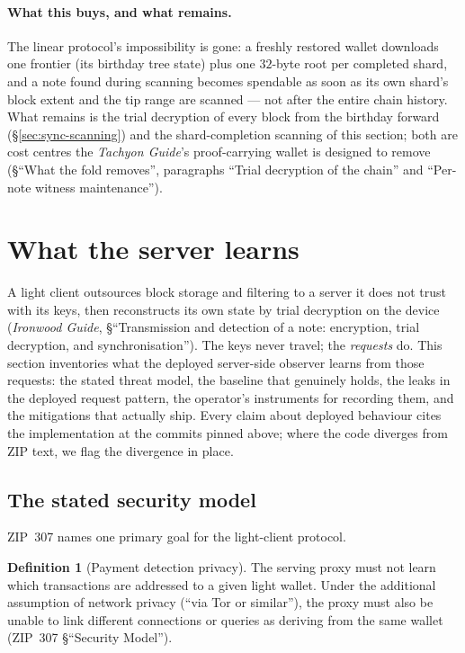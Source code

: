 \documentclass[11pt,a4paper]{article}
\theoremstyle{definition}
\newtheorem{definition}[theorem]{Definition}
\begin{document}
\paragraph{What this buys, and what remains.} The linear protocol's
impossibility is gone: a freshly restored wallet downloads one frontier
(its birthday tree state) plus one $32$-byte root per completed shard,
and a note found during scanning becomes spendable as soon as its own
shard's block extent and the tip range are scanned --- not after the
entire chain history. What remains is the trial decryption of every
block from the birthday forward (\S\ref{sec:sync-scanning}) and the
shard-completion scanning of this section; both are cost centres the
\emph{Tachyon Guide}'s proof-carrying wallet is designed to remove
(\S``What the fold removes'', paragraphs ``Trial decryption of the
chain'' and ``Per-note witness maintenance'').

\section{What the server learns}\label{sec:sync-privacy}

A light client outsources block storage and filtering to a server it does
not trust with its keys, then reconstructs its own state by trial
decryption on the device (\emph{Ironwood Guide}, \S``Transmission and
detection of a note: encryption, trial decryption, and synchronisation'').
The keys never travel; the \emph{requests} do. This section inventories
what the deployed server-side observer learns from those requests: the
stated threat model, the baseline that genuinely holds, the leaks in the
deployed request pattern, the operator's instruments for recording them,
and the mitigations that actually ship. Every claim about deployed
behaviour cites the implementation at the commits pinned above; where the
code diverges from ZIP text, we flag the divergence in place.

\subsection{The stated security model}\label{sec:sync-privacy-model}

ZIP~307 names one primary goal for the light-client protocol.

\begin{definition}[Payment detection privacy]\label{def:sync-pdp}
The serving proxy must not learn which transactions are addressed to a
given light wallet. Under the additional assumption of network privacy
(``via Tor or similar''), the proxy must also be unable to link different
connections or queries as deriving from the same wallet
(ZIP~307 \S``Security Model'').
\end{definition}
\end{document}
